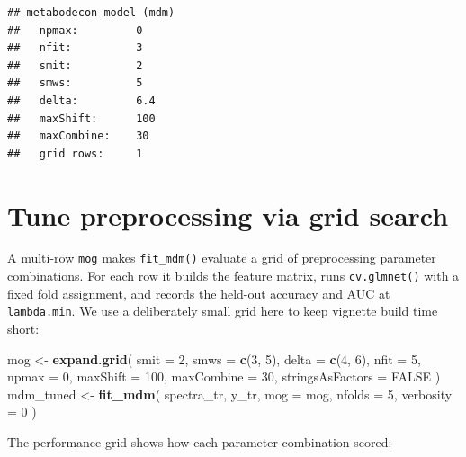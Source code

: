 \documentclass[
]{article}
\newenvironment{Shaded}{\begin{snugshade}}{\end{snugshade}}
\newcommand{\DataTypeTok}[1]{\textcolor[rgb]{0.13,0.29,0.53}{#1}}
\newcommand{\DecValTok}[1]{\textcolor[rgb]{0.00,0.00,0.81}{#1}}
\newcommand{\KeywordTok}[1]{\textcolor[rgb]{0.13,0.29,0.53}{\textbf{#1}}}
\newcommand{\NormalTok}[1]{#1}
\newcommand{\OtherTok}[1]{\textcolor[rgb]{0.56,0.35,0.01}{#1}}
\newcommand{\StringTok}[1]{\textcolor[rgb]{0.31,0.60,0.02}{#1}}
\begin{document}
\begin{verbatim}
## metabodecon model (mdm)
##   npmax:         0
##   nfit:          3
##   smit:          2
##   smws:          5
##   delta:         6.4
##   maxShift:      100
##   maxCombine:    30
##   grid rows:     1
\end{verbatim}

\hypertarget{tune-preprocessing-via-grid-search}{%
\section{Tune preprocessing via grid
search}\label{tune-preprocessing-via-grid-search}}

A multi-row \texttt{mog} makes \texttt{fit\_mdm()} evaluate a grid of
preprocessing parameter combinations. For each row it builds the feature
matrix, runs \texttt{cv.glmnet()} with a fixed fold assignment, and
records the held-out accuracy and AUC at \texttt{lambda.min}. We use a
deliberately small grid here to keep vignette build time short:

\begin{Shaded}
\begin{Highlighting}[]
\NormalTok{mog \textless{}{-}}\StringTok{ }\KeywordTok{expand.grid}\NormalTok{(}
    \DataTypeTok{smit =} \DecValTok{2}\NormalTok{, }\DataTypeTok{smws =} \KeywordTok{c}\NormalTok{(}\DecValTok{3}\NormalTok{, }\DecValTok{5}\NormalTok{), }\DataTypeTok{delta =} \KeywordTok{c}\NormalTok{(}\DecValTok{4}\NormalTok{, }\DecValTok{6}\NormalTok{), }\DataTypeTok{nfit =} \DecValTok{5}\NormalTok{, }\DataTypeTok{npmax =} \DecValTok{0}\NormalTok{,}
    \DataTypeTok{maxShift =} \DecValTok{100}\NormalTok{, }\DataTypeTok{maxCombine =} \DecValTok{30}\NormalTok{,}
    \DataTypeTok{stringsAsFactors =} \OtherTok{FALSE}
\NormalTok{)}
\NormalTok{mdm\_tuned \textless{}{-}}\StringTok{ }\KeywordTok{fit\_mdm}\NormalTok{(}
\NormalTok{    spectra\_tr, y\_tr, }\DataTypeTok{mog =}\NormalTok{ mog, }\DataTypeTok{nfolds =} \DecValTok{5}\NormalTok{, }\DataTypeTok{verbosity =} \DecValTok{0}
\NormalTok{)}
\end{Highlighting}
\end{Shaded}

The performance grid shows how each parameter combination scored:
\end{document}
